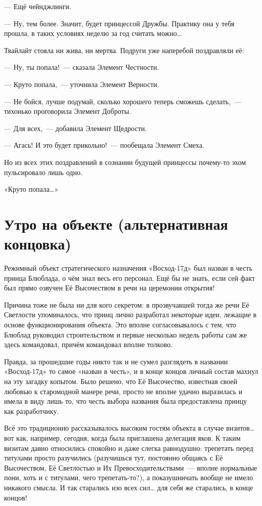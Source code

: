 \documentclass[twoside,a5paper,12pt]{extbook}
\begin{document}
— Ещё чейнджлинги.

— Ну, тем более. Значит, будет принцессой Дружбы. Практику она у тебя прошла, в таких условиях неделю за год считать можно…

Твайлайт стояла ни жива, ни мертва. Подруги уже наперебой поздравляли её:

— Ну, ты попала! — сказала Элемент Честности.

— Круто попала, — уточнила Элемент Верности.

— Не бойся, лучше подумай, сколько хорошего теперь сможешь сделать, — тихонько проговорила Элемент Доброты.

— Для всех, — добавила Элемент Щедрости.

— Агась! И это будет прикольно! — пообещала Элемент Смеха.

Но из всех этих поздравлений в сознании будущей принцессы почему-то эхом пульсировало лишь одно.

«Круто попала…»

\chapter{Утро на объекте (альтернативная концовка)}




Режимный объект стратегического назначения «Восход-17д» был назван в честь принца Блюблада, о чём знал весь его персонал. Ещё бы не знать, если сей факт был прямо озвучен Её Высочеством в речи на церемонии открытия!

Причина тоже не была ни для кого секретом: в прозвучавшей тогда же речи Её Светлости упоминалось, что принц лично разработал некоторые идеи, лежащие в основе функционирования объекта. Это вполне согласовывалось с тем, что Блюблад руководил строительством и первые несколько недель работы сам же здесь командовал, причём командовал вполне толково.

Правда, за прошедшие годы никто так и не сумел разглядеть в названии «Восход-17д» то самое «назван в честь», и в конце концов личный состав махнул на эту загадку копытом. Было решено, что Её Высочество, известная своей любовью к старомодной манере речи, просто не вполне удачно выразилась и имела в виду лишь то, что честь выбора названия была предоставлена принцу как разработчику.

Всё это традиционно рассказывалось высоким гостям объекта в случае визитов… вот как, например, сегодня, когда была приглашена делегация яков. К таким визитам давно относились спокойно и даже слегка равнодушно: трепетать перед титулами просто разучились (разучишься тут, постоянно общаясь с Её Высочеством, Её Светлостью и Их Превосходительствами — вполне нормальные пони, хоть и с титулами, чего трепетать-то?), а показушничать вообще не имело никакого смысла. И так старались изо всех сил… для себя же старались, в конце концов!
\end{document}
